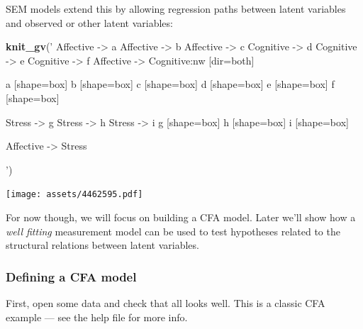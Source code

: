 \documentclass[]{article}
\newenvironment{Shaded}{\begin{snugshade}}{\end{snugshade}}
\newcommand{\KeywordTok}[1]{\textcolor[rgb]{0.13,0.29,0.53}{\textbf{#1}}}
\newcommand{\NormalTok}[1]{#1}
\newcommand{\StringTok}[1]{\textcolor[rgb]{0.31,0.60,0.02}{#1}}
\begin{document}
SEM models extend this by allowing regression paths between latent variables and
observed or other latent variables:

\begin{Shaded}
\begin{Highlighting}[]
\KeywordTok{knit_gv}\NormalTok{(}\StringTok{'}
\StringTok{        Affective -> a}
\StringTok{Affective -> b}
\StringTok{Affective -> c}
\StringTok{Cognitive -> d}
\StringTok{Cognitive -> e}
\StringTok{Cognitive -> f}
\StringTok{Affective -> Cognitive:nw [dir=both]}

\StringTok{a [shape=box]}
\StringTok{b [shape=box]}
\StringTok{c [shape=box]}
\StringTok{d [shape=box]}
\StringTok{e [shape=box]}
\StringTok{f [shape=box]}


\StringTok{Stress -> g}
\StringTok{Stress -> h}
\StringTok{Stress -> i}
\StringTok{g [shape=box]}
\StringTok{h [shape=box]}
\StringTok{i [shape=box]}

\StringTok{Affective -> Stress}

\StringTok{        '}\NormalTok{)}
\end{Highlighting}
\end{Shaded}

\texttt{[image: assets/4462595.pdf]}

For now though, we will focus on building a CFA model. Later we'll show how a
\emph{well fitting} measurement model can be used to test hypotheses related to the
structural relations between latent variables.

\hypertarget{defining-a-cfa-model}{%
\subsubsection*{Defining a CFA model}\label{defining-a-cfa-model}}

First, open some data and check that all looks well. This is a classic CFA
example --- see the help file for more info.
\end{document}
